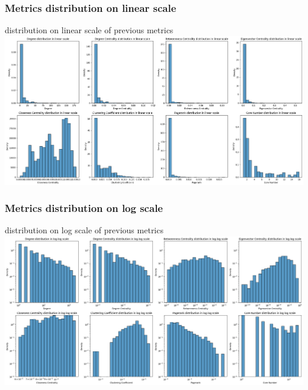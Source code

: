 \documentclass[12pt]{article}
\begin{document}
\begin{minipage}{\textwidth}
    \subsubsection{Metrics distribution on linear scale}
    {distribution on linear scale of previous metrics}
    \centering
    \includegraphics[width=1\linewidth]{img/metrics_output.png}
\end{minipage}

\begin{minipage}{\textwidth}
    \subsubsection{Metrics distribution on log scale}
    {distribution on log scale of previous metrics}
    \centering
    \includegraphics[width=1\linewidth]{img/metrics_logscale_output.png}
\end{minipage}
\end{document}
